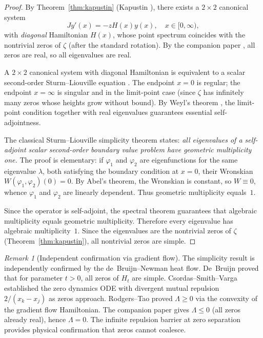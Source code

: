 \documentclass[11pt,a4paper]{amsart}
\theoremstyle{definition}
\theoremstyle{remark}
\newtheorem{remark}[theorem]{Remark}
\begin{document}
\begin{proof}
By Theorem~\ref{thm:kapustin} (Kapustin \cite{Kap22a}), there exists a $2\times 2$ canonical system
\[
Jy'(x) = -zH(x)y(x), \quad x\in [0,\infty),
\]
with \emph{diagonal} Hamiltonian $H(x)$, whose point spectrum coincides with the nontrivial zeros of $\zeta$ (after the standard rotation). By the companion paper \cite{Shr26c}, all zeros are real, so all eigenvalues are real.

A $2\times 2$ canonical system with diagonal Hamiltonian is equivalent to a scalar second-order Sturm--Liouville equation \cite[\S\S36--38]{dB68}. The endpoint $x = 0$ is regular; the endpoint $x = \infty$ is singular and in the limit-point case (since $\zeta$ has infinitely many zeros whose heights grow without bound). By Weyl's theorem \cite{Weyl10}, the limit-point condition together with real eigenvalues guarantees essential self-adjointness.

The classical Sturm--Liouville simplicity theorem \cite[Ch.\,7]{CL55} states: \emph{all eigenvalues of a self-adjoint scalar second-order boundary value problem have geometric multiplicity one.} The proof is elementary: if $\varphi_1$ and $\varphi_2$ are eigenfunctions for the same eigenvalue $\lambda$, both satisfying the boundary condition at $x = 0$, their Wronskian $W(\varphi_1,\varphi_2)(0) = 0$. By Abel's theorem, the Wronskian is constant, so $W\equiv 0$, whence $\varphi_1$ and $\varphi_2$ are linearly dependent. Thus geometric multiplicity equals~$1$.

Since the operator is self-adjoint, the spectral theorem guarantees that algebraic multiplicity equals geometric multiplicity. Therefore every eigenvalue has algebraic multiplicity~$1$. Since the eigenvalues are the nontrivial zeros of $\zeta$ (Theorem~\ref{thm:kapustin}), all nontrivial zeros are simple.
\end{proof}

\begin{remark}[Independent confirmation via gradient flow]\label{rem:gradient}
The simplicity result is independently confirmed by the de~Bruijn--Newman heat flow. De~Bruijn \cite{dB50} proved that for parameter $t > 0$, all zeros of $H_t$ are simple. Csordas--Smith--Varga \cite{CSV88} established the zero dynamics ODE with divergent mutual repulsion $2/(x_k - x_j)$ as zeros approach. Rodgers--Tao \cite{RT20} proved $\Lambda \geq 0$ via the convexity of the gradient flow Hamiltonian. The companion paper \cite{Shr26c} gives $\Lambda \leq 0$ (all zeros already real), hence $\Lambda = 0$. The infinite repulsion barrier at zero separation provides physical confirmation that zeros cannot coalesce.
\end{remark}
\end{document}
